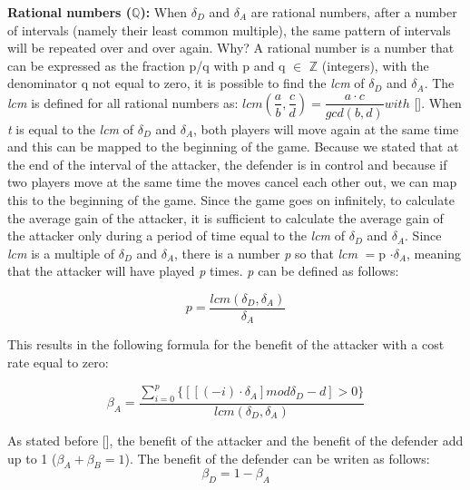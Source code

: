 \textbf{Rational numbers (\(\mathbb{Q}\)):} When $\delta_{D}$ and $\delta_{A}$ are rational numbers, after a number of intervals (namely their least common multiple), the same pattern of intervals will be repeated over and over again. Why? A rational number is a number that can be expressed as the fraction p/q with p and q $\in$ \(\mathbb{Z}\) (integers), with the denominator q not equal to zero, it is possible to find the \textit{lcm} of $\delta_{D}$ and $\delta_{A}$. The \textit{lcm} is defined for all rational numbers as: $lcm(\dfrac{a}{b},\dfrac{c}{d})= \dfrac{a \cdot c}{gcd(b,d)} with  $ []. When \textit{t} is equal to the \textit{lcm} of $\delta_{D}$ and $\delta_{A}$, both players will move again at the same time and this can be mapped to the beginning of the game. Because we stated that at the end of the interval of the attacker, the defender is in control and because if two players move at the same time the moves cancel each other out, we can map this to the beginning of the game. Since the game goes on infinitely, to calculate the average gain of the attacker, it is sufficient to calculate the average gain of the attacker only during a period of time equal to the \textit{lcm} of $\delta_{D}$ and $\delta_{A}$. Since \textit{lcm} is a multiple of $\delta_{D}$ and $\delta_{A}$, there is a number \textit{p} so that \textit{lcm} $=$p $\cdot \delta_{A}$, meaning that the attacker will have played \textit{p} times. \textit{p} can be defined as follows:


\begin{equation}\label{first}
p = \dfrac{lcm(\delta_{D},\delta_{A})}{\delta_{A} } 
\end{equation}


This results in the following formula for the benefit of the attacker with a cost rate equal to zero:

\begin{equation}\label{first}
\beta_{A} = \dfrac{\sum_{i=0}^{p} \lbrace [[(  - i ) \cdot \delta_{A}] mod \delta_{D} - d] > 0 \rbrace }{lcm(\delta_{D},\delta_{A})} 
\end{equation}

As stated before [], the benefit of the attacker and the benefit of the defender add up to 1 ($\beta_{A} + \beta_{B} = 1$). The benefit of the defender can be writen as follows:
\begin{equation}\label{first}
\beta_{D} = 1 - \beta_{A}
\end{equation}

